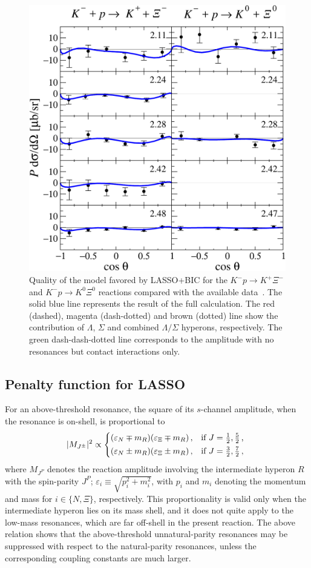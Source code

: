 \documentclass[10pt,aps,prc,superscriptaddress,twoside,twocolumn,nofootinbib,showpacs,preprintnumbers]{revtex4-1}
\begin{document}
\begin{figure}[t]
\includegraphics[height=0.31\textwidth,clip=1]{pol12_lasso_pruned_3sigma_BackwardAS_lambda-5_scaledgwidth_no493_g_initial-1_a.pdf}
\caption{
Quality of the model favored by LASSO+BIC for the $K^-p\to K^+\Xi^-$ and $K^-p\to K^0\Xi^0$ reactions compared with the available data~\cite{Carmony:1964zza,Berge:1966zz,Berge:1966zz,London:1966zz,Trippe:1967wat,Burgun:1969ee,Trower:1968zz,Dauber:1969hg,Scheuer:1971zw,DeBellefon:1972gm,Rader:1973ja,Griselin:1975pa,Briefel:1977bp}. The solid blue line represents the result of the full calculation. The red (dashed), magenta (dash-dotted) and brown (dotted) line show the contribution of $\Lambda$, $\Sigma$ and combined $\Lambda/\Sigma$ hyperons, respectively. The green dash-dash-dotted line corresponds to the amplitude with no resonances but contact interactions only.
\label{fig:KXi-txsc}}
\end{figure}

\subsection{Penalty function for LASSO} 
\label{subsec:KXi-LASSO}

For an above-threshold resonance, the square of its $s$-channel amplitude, when the resonance is on-shell, is proportional to \cite{MON11}
%
\begin{equation}
\lvert M_{J^{\pm}} \rvert^2 \propto \begin{cases*}
(\varepsilon_N \mp m_R)(\varepsilon_\Xi  \mp m_R)\,,&if $J=\frac12,\frac52$\,,  \\
(\varepsilon_N \pm m_R)(\varepsilon_\Xi  \pm m_R)\,,&if $J=\frac32,\frac72$\,,  
\end{cases*}
\label{eq:KXi-osfactor}
\end{equation}
% 
where $M_{J^P}$ denotes the reaction amplitude involving the intermediate hyperon $R$ with the spin-parity $J^P$;  
$\varepsilon_i \equiv \sqrt{p_i^2 + m_i^2}$, with $p_i$ and $m_i$ denoting the momentum and mass  for $i\in\{N,\Xi\}$, respectively. This proportionality is valid only when the intermediate hyperon lies on its mass shell, and it does not quite apply to the low-mass resonances, which are far off-shell in the present reaction. The above relation shows that the above-threshold unnatural-parity resonances may be suppressed with respect to the natural-parity resonances, unless the corresponding coupling constants are much larger. 
\end{document}
